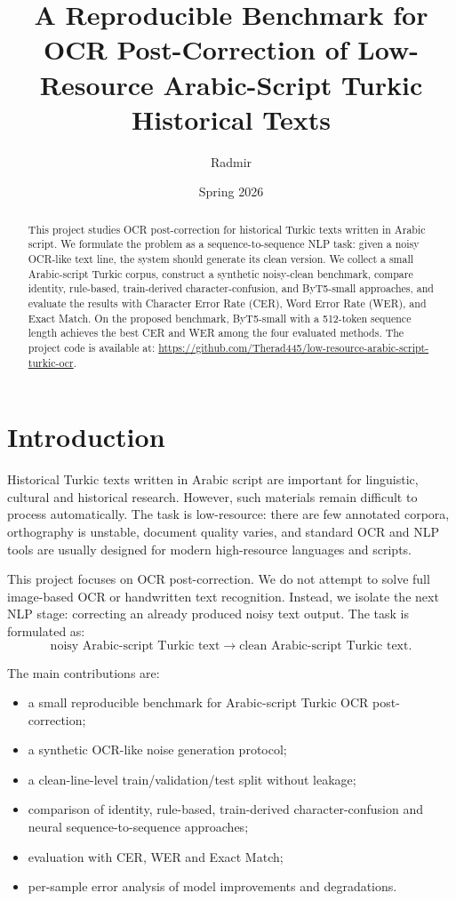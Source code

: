 \documentclass{article}
\title{A Reproducible Benchmark for OCR Post-Correction of Low-Resource Arabic-Script Turkic Historical Texts}
\author{Radmir}
\date{Spring 2026}
\begin{document}
\maketitle

\begin{abstract}
This project studies OCR post-correction for historical Turkic texts written in Arabic script. We formulate the problem as a sequence-to-sequence NLP task: given a noisy OCR-like text line, the system should generate its clean version. We collect a small Arabic-script Turkic corpus, construct a synthetic noisy-clean benchmark, compare identity, rule-based, train-derived character-confusion, and ByT5-small approaches, and evaluate the results with Character Error Rate (CER), Word Error Rate (WER), and Exact Match. On the proposed benchmark, ByT5-small with a 512-token sequence length achieves the best CER and WER among the four evaluated methods. The project code is available at: \url{https://github.com/Therad445/low-resource-arabic-script-turkic-ocr}.
\end{abstract}

\section{Introduction}

Historical Turkic texts written in Arabic script are important for linguistic, cultural and historical research. However, such materials remain difficult to process automatically. The task is low-resource: there are few annotated corpora, orthography is unstable, document quality varies, and standard OCR and NLP tools are usually designed for modern high-resource languages and scripts.

This project focuses on OCR post-correction. We do not attempt to solve full image-based OCR or handwritten text recognition. Instead, we isolate the next NLP stage: correcting an already produced noisy text output. The task is formulated as:
\[
\text{noisy Arabic-script Turkic text} \rightarrow \text{clean Arabic-script Turkic text}.
\]

The main contributions are:
\begin{itemize}
    \item a small reproducible benchmark for Arabic-script Turkic OCR post-correction;
    \item a synthetic OCR-like noise generation protocol;
    \item a clean-line-level train/validation/test split without leakage;
    \item comparison of identity, rule-based, train-derived character-confusion and neural sequence-to-sequence approaches;
    \item evaluation with CER, WER and Exact Match;
    \item per-sample error analysis of model improvements and degradations.
\end{itemize}
\end{document}

